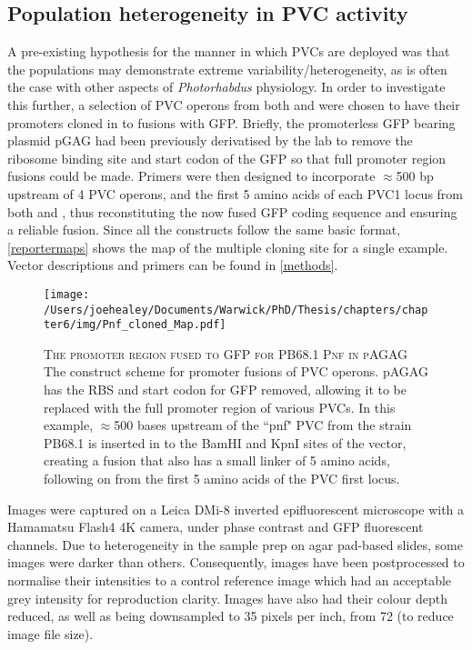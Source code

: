 \subsection{Population heterogeneity in PVC activity}\label{heterogeneity}
A pre-existing hypothesis for the manner in which PVCs are deployed was that the populations may demonstrate extreme variability/heterogeneity, as is often the case with other aspects of \emph{Photorhabdus} physiology. In order to investigate this further, a selection of PVC operons from both \Plum{} and \Pasy{} were chosen to have their promoters cloned in to fusions with GFP. Briefly, the promoterless GFP bearing plasmid pGAG had been previously derivatised by the lab to remove the ribosome binding site and start codon of the GFP so that full promoter region fusions could be made. Primers were then designed to incorporate $\approx$500 bp upstream of 4 PVC operons, and the first 5 amino acids of each PVC1 locus from both \Plum{} and \Pasy, thus reconstituting the now fused GFP coding sequence and ensuring a reliable fusion. Since all the constructs follow the same basic format, \vref{reportermaps} shows the map of the multiple cloning site for a single example. Vector descriptions and primers can be found in \vref{methods}.


\begin{figure}[h]
    \texttt{[image: /Users/joehealey/Documents/Warwick/PhD/Thesis/chapters/chapter6/img/Pnf\_cloned\_Map.pdf]}
    \captionsetup{singlelinecheck=off, justification=justified, font=footnotesize, aboveskip=10pt}
    \caption[Example of promoter fusions for PVC operons]{\textsc{\normalsize The promoter region fused to GFP for \Pasy{} PB68.1 Pnf in pAGAG} \vspace{0.1cm} \newline The construct scheme for promoter fusions of PVC operons. pAGAG has the RBS and start codon for GFP removed, allowing it to be replaced with the full promoter region of various PVCs. In this example, $\approx$500 bases upstream of the ``pnf" PVC from the \Pasy{} strain PB68.1 is inserted in to the BamHI and KpnI sites of the vector, creating a fusion that also has a small linker of 5 amino acids, following on from the first 5 amino acids of the PVC first locus.}
\label{reportermaps}
\end{figure}




Images were captured on a Leica DMi-8 inverted epifluorescent microscope with a Hamamatsu Flash4 4K camera, under phase contrast and GFP fluorescent channels. Due to heterogeneity in the sample prep on agar pad-based slides, some images were darker than others. Consequently, images have been postprocessed to normalise their intensities to a control reference image which had an acceptable grey intensity for reproduction clarity. Images have also had their colour depth reduced, as well as being downsampled to 35 pixels per inch, from 72 (to reduce image file size).


